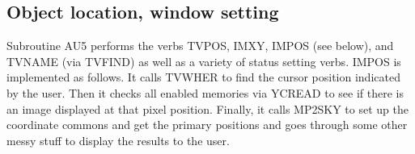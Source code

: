 \subsection{Object location, window setting}
Subroutine AU5 performs the verbs TVPOS, IMXY, IMPOS (see
below), and TVNAME (via TVFIND) as well as a variety of status setting
verbs. IMPOS is implemented as follows.  It calls TVWHER
to find the cursor
position indicated by the user.  Then it checks all enabled memories
via YCREAD to see if there is an image displayed at that
pixel position.  Finally, it calls MP2SKY to set up the
coordinate commons and get the primary positions and goes through some
other messy stuff to display the results to the user.

